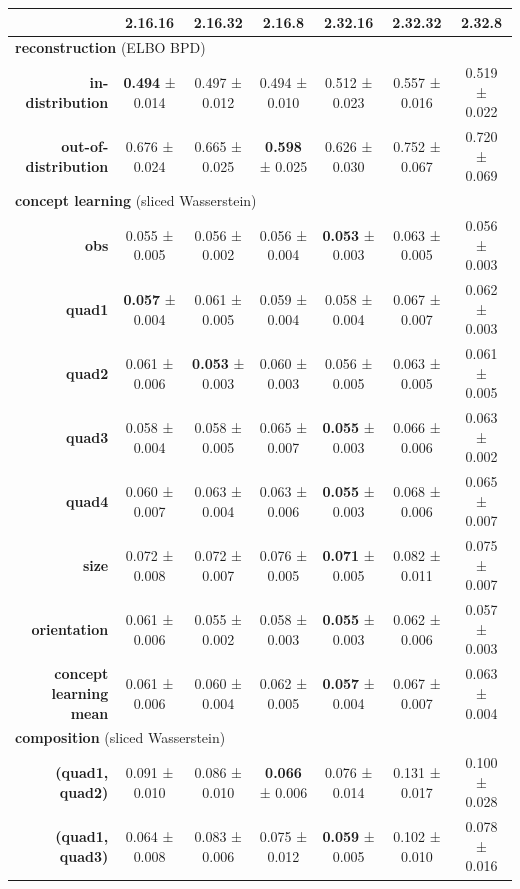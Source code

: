 \begin{tabular}{rcccccc}
\toprule
& \textbf{2.16.16} & \textbf{2.16.32} & \textbf{2.16.8} & \textbf{2.32.16} & \textbf{2.32.32} & \textbf{2.32.8} \\
\midrule
\multicolumn{ 7 }{l}{\textbf{reconstruction}  (ELBO BPD)} \\
\midrule
\textbf{in-distribution} & \textbf{0.494} ± 0.014 & 0.497 ± 0.012 & 0.494 ± 0.010 & 0.512 ± 0.023 & 0.557 ± 0.016 & 0.519 ± 0.022 \\
\textbf{out-of-distribution} & 0.676 ± 0.024 & 0.665 ± 0.025 & \textbf{0.598} ± 0.025 & 0.626 ± 0.030 & 0.752 ± 0.067 & 0.720 ± 0.069 \\
\midrule
\multicolumn{ 7 }{l}{\textbf{concept learning}  (sliced Wasserstein)} \\
\midrule
\textbf{obs} & 0.055 ± 0.005 & 0.056 ± 0.002 & 0.056 ± 0.004 & \textbf{0.053} ± 0.003 & 0.063 ± 0.005 & 0.056 ± 0.003 \\
\textbf{quad1} & \textbf{0.057} ± 0.004 & 0.061 ± 0.005 & 0.059 ± 0.004 & 0.058 ± 0.004 & 0.067 ± 0.007 & 0.062 ± 0.003 \\
\textbf{quad2} & 0.061 ± 0.006 & \textbf{0.053} ± 0.003 & 0.060 ± 0.003 & 0.056 ± 0.005 & 0.063 ± 0.005 & 0.061 ± 0.005 \\
\textbf{quad3} & 0.058 ± 0.004 & 0.058 ± 0.005 & 0.065 ± 0.007 & \textbf{0.055} ± 0.003 & 0.066 ± 0.006 & 0.063 ± 0.002 \\
\textbf{quad4} & 0.060 ± 0.007 & 0.063 ± 0.004 & 0.063 ± 0.006 & \textbf{0.055} ± 0.003 & 0.068 ± 0.006 & 0.065 ± 0.007 \\
\textbf{size} & 0.072 ± 0.008 & 0.072 ± 0.007 & 0.076 ± 0.005 & \textbf{0.071} ± 0.005 & 0.082 ± 0.011 & 0.075 ± 0.007 \\
\textbf{orientation} & 0.061 ± 0.006 & 0.055 ± 0.002 & 0.058 ± 0.003 & \textbf{0.055} ± 0.003 & 0.062 ± 0.006 & 0.057 ± 0.003 \\
\addlinespace
\textbf{concept learning mean} & 0.061 ± 0.006 & 0.060 ± 0.004 & 0.062 ± 0.005 & \textbf{0.057} ± 0.004 & 0.067 ± 0.007 & 0.063 ± 0.004 \\
\midrule
\multicolumn{ 7 }{l}{\textbf{composition}  (sliced Wasserstein)} \\
\midrule
\textbf{(quad1, quad2)} & 0.091 ± 0.010 & 0.086 ± 0.010 & \textbf{0.066} ± 0.006 & 0.076 ± 0.014 & 0.131 ± 0.017 & 0.100 ± 0.028 \\
\textbf{(quad1, quad3)} & 0.064 ± 0.008 & 0.083 ± 0.006 & 0.075 ± 0.012 & \textbf{0.059} ± 0.005 & 0.102 ± 0.010 & 0.078 ± 0.016 \\

\end{tabular}
